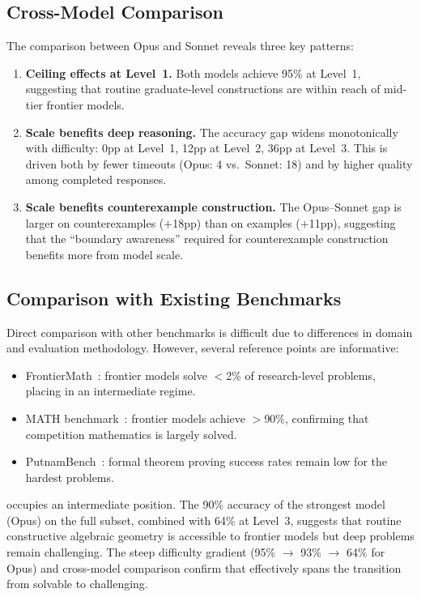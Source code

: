 \subsection{Cross-Model Comparison}

The comparison between Opus and Sonnet reveals three key patterns:

\begin{enumerate}[nosep]
  \item \textbf{Ceiling effects at Level~1.} Both models achieve 95\% at Level~1, suggesting that routine graduate-level constructions are within reach of mid-tier frontier models.
  \item \textbf{Scale benefits deep reasoning.} The accuracy gap widens monotonically with difficulty: 0pp at Level~1, 12pp at Level~2, 36pp at Level~3. This is driven both by fewer timeouts (Opus: 4 vs.\ Sonnet: 18) and by higher quality among completed responses.
  \item \textbf{Scale benefits counterexample construction.} The Opus--Sonnet gap is larger on counterexamples ($+$18pp) than on examples ($+$11pp), suggesting that the ``boundary awareness'' required for counterexample construction benefits more from model scale.
\end{enumerate}

\subsection{Comparison with Existing Benchmarks}

Direct comparison with other benchmarks is difficult due to differences in domain and evaluation methodology.
However, several reference points are informative:
\begin{itemize}[nosep]
  \item FrontierMath~\citep{glazer2024frontiermath}: frontier models solve $<$2\% of research-level problems, placing \ecagbench{} in an intermediate regime.
  \item MATH benchmark~\citep{hendrycks2021measuring}: frontier models achieve $>$90\%, confirming that competition mathematics is largely solved.
  \item PutnamBench~\citep{tsoukalas2024putnambench}: formal theorem proving success rates remain low for the hardest problems.
\end{itemize}

\ecagbench{} occupies an intermediate position.
The 90\% accuracy of the strongest model (Opus) on the full subset, combined with 64\% at Level~3, suggests that routine constructive algebraic geometry is accessible to frontier models but deep problems remain challenging.
The steep difficulty gradient (95\% $\to$ 93\% $\to$ 64\% for Opus) and cross-model comparison confirm that \ecagbench{} effectively spans the transition from solvable to challenging.
